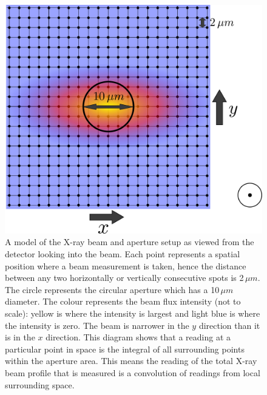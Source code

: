 \begin{figure}
    \centering
    \includegraphics[width=1\textwidth]{figures/beam/aperture_scan_drawing.pdf}
    \caption{A model of the X-ray beam and aperture setup as viewed from the detector looking into the beam.
    Each point represents a spatial position where a beam measurement is taken, hence the distance between any two horizontally or vertically consecutive spots is 2$\,\mu m$.
    The circle represents the circular aperture which has a 10$\,\mu m$ diameter.
    The colour represents the beam flux intensity (not to scale): yellow is where the intensity is largest and light blue is where the intensity is zero.
    The beam is narrower in the $y$ direction than it is in the $x$ direction.
    This diagram shows that a reading at a particular point in space is the integral of all surrounding points within the aperture area.
    This means the reading of the total X-ray beam profile that is measured is a convolution of readings from local surrounding space.}
    \label{fig:Aperture scan model - DLS}
\end{figure}

